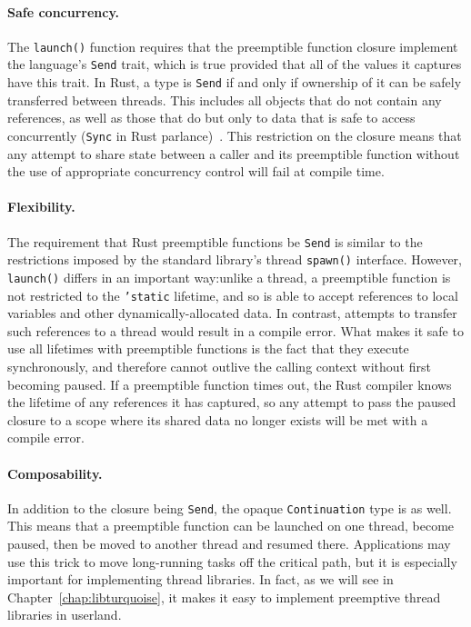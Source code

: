 \paragraph{Safe concurrency.}
The \texttt{launch()} function requires that the preemptible function closure
implement the language's \texttt{Send} trait, which is true provided that all of the
values it captures have this trait.  In Rust, a type is \texttt{Send} if and only if
ownership of it can be safely transferred between threads.  This includes all objects
that do not contain any references, as well as those that do but only to data that is
safe to access concurrently (\texttt{Sync} in Rust parlance)~\cite{www-rustlang-conc}.
This restriction on
the closure means that any attempt to share state between a caller and its
preemptible function without the use of appropriate concurrency control will fail at
compile time.


\paragraph{Flexibility.}
The requirement that Rust preemptible functions be \texttt{Send} is similar to the
restrictions imposed by the standard library's thread \texttt{spawn()} interface.
However, \texttt{launch()} differs in an important way:\@ unlike a thread, a
preemptible function is not restricted to the \texttt{'static} lifetime, and so is
able to accept references to local variables and other dynamically-allocated data.
In contrast, attempts to transfer such references to a thread would result in a
compile error.  What makes it safe to use all lifetimes with preemptible functions is
the fact that they execute synchronously, and therefore cannot outlive the calling
context without first becoming paused.  If a preemptible function times out, the Rust
compiler knows the lifetime of any references it has captured, so any attempt to pass
the paused closure to a scope where its shared data no longer exists will be met with
a compile error.


\paragraph{Composability.}
In addition to the closure being \texttt{Send}, the opaque \texttt{Continuation} type
is as well.  This means that a preemptible function can be launched on one thread,
become paused, then be moved to another thread and resumed there.  Applications may
use this trick to move long-running tasks off the critical path, but it is especially
important for implementing thread libraries.  In fact, as we will see in
Chapter~\ref{chap:libturquoise}, it makes it easy to implement preemptive thread
libraries in userland.


